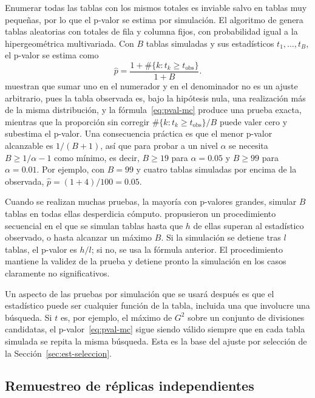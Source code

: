 Enumerar todas las tablas con los mismos totales es inviable salvo en tablas muy
pequeñas, por lo que el p-valor se estima por simulación. El algoritmo de
\cite{Patefield1981} genera tablas aleatorias con totales de fila y columna
fijos, con probabilidad igual a la hipergeométrica multivariada. Con $B$ tablas
simuladas y sus estadísticos $t_1, \dots, t_B$, el p-valor se estima como
\begin{equation}\label{eq:pval-mc}
  \hat{p} = \frac{1 + \#\{k : t_k \ge t_{\mathrm{obs}}\}}{1 + B} .
\end{equation}
\cite{Phipson2010} muestran que sumar uno en el numerador y en el denominador no
es un ajuste arbitrario, pues la tabla observada es, bajo la hipótesis nula, una
realización más de la misma distribución, y la fórmula~\eqref{eq:pval-mc} produce
una prueba exacta, mientras que la proporción sin corregir $\#\{k : t_k \ge
t_{\mathrm{obs}}\}/B$ puede valer cero y subestima el p-valor. Una consecuencia
práctica es que el menor p-valor alcanzable es $1/(B+1)$, así que para probar a un
nivel $\alpha$ se necesita $B \ge 1/\alpha - 1$ como mínimo, es decir, $B \ge 19$ para
$\alpha = 0.05$ y $B \ge 99$ para $\alpha = 0.01$. Por ejemplo, con $B = 99$ y
cuatro tablas simuladas por encima de la observada, $\hat{p} = (1+4)/100 = 0.05$.

Cuando se realizan muchas pruebas, la mayoría con p-valores grandes, simular $B$
tablas en todas ellas desperdicia cómputo. \cite{Besag1991} propusieron un
procedimiento secuencial en el que se simulan tablas hasta que $h$ de ellas superan al
estadístico observado, o hasta alcanzar un máximo $B$. Si la simulación se detiene
tras $l$ tablas, el p-valor es $h/l$; si no, se usa la fórmula anterior. El
procedimiento mantiene la validez de la prueba y detiene pronto la simulación en
los casos claramente no significativos.

Un aspecto de las pruebas por simulación que se usará después es que el
estadístico puede ser cualquier función de la tabla, incluida una que involucre
una búsqueda. Si $t$ es, por ejemplo, el máximo de $G^2$ sobre un conjunto de
divisiones candidatas, el p-valor~\eqref{eq:pval-mc} sigue siendo válido siempre
que en cada tabla simulada se repita la misma búsqueda. Esta es la base del ajuste
por selección de la Sección~\ref{sec:est-seleccion}.

\subsection{Remuestreo de réplicas independientes}\label{sec:est-bootstrap}

